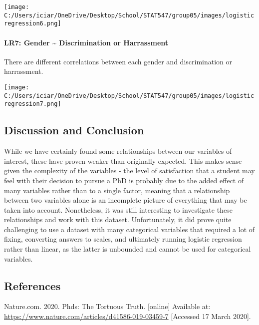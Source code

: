 \documentclass[
]{article}
\begin{document}
\texttt{[image: C:/Users/iciar/OneDrive/Desktop/School/STAT547/group05/images/logisticregression6.png]}

\hypertarget{lr7-gender-discrimination-or-harrassment}{%
\paragraph{LR7: Gender \textasciitilde{} Discrimination or
Harrassment}\label{lr7-gender-discrimination-or-harrassment}}

There are different correlations between each gender and discrimination
or harrassment.

\texttt{[image: C:/Users/iciar/OneDrive/Desktop/School/STAT547/group05/images/logisticregression7.png]}

\hypertarget{discussion-and-conclusion}{%
\subsection{Discussion and Conclusion}\label{discussion-and-conclusion}}

While we have certainly found some relationships between our variables
of interest, these have proven weaker than originally expected. This
makes sense given the complexity of the variables - the level of
satisfaction that a student may feel with their decision to pursue a PhD
is probably due to the added effect of many variables rather than to a
single factor, meaning that a relationship between two variables alone
is an incomplete picture of everything that may be taken into account.
Nonetheless, it was still interesting to investigate these relationships
and work with this dataset. Unfortunately, it did prove quite
challenging to use a dataset with many categorical variables that
required a lot of fixing, converting answers to scales, and ultimately
running logistic regression rather than linear, as the latter is
unbounded and cannot be used for categorical variables.

\hypertarget{references}{%
\subsection{References}\label{references}}

Nature.com. 2020. Phds: The Tortuous Truth. {[}online{]} Available at:
\url{https://www.nature.com/articles/d41586-019-03459-7} {[}Accessed 17
March 2020{]}.
\end{document}
